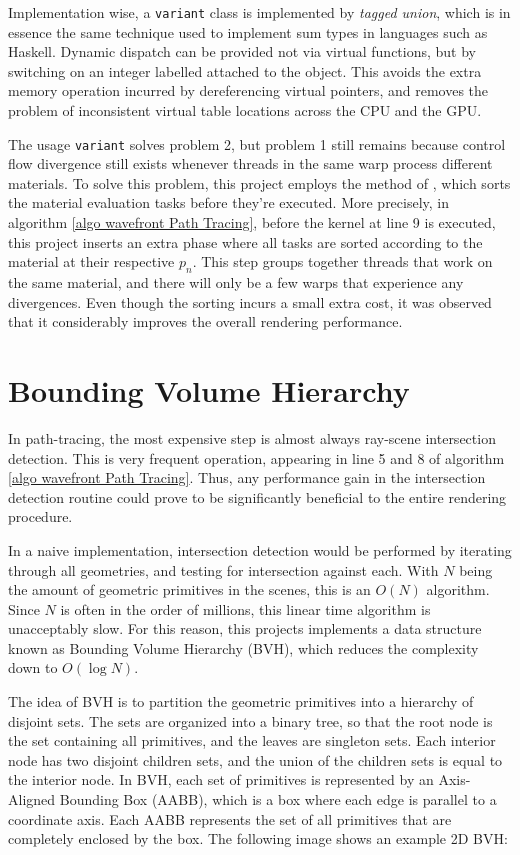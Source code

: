 Implementation wise, a \texttt{variant} class is implemented by \textit{tagged union}, which is in essence the same technique used to implement sum types in languages such as Haskell. Dynamic dispatch can be provided not via virtual functions, but by switching on an integer labelled attached to the object. This avoids the extra memory operation incurred by dereferencing virtual pointers, and removes the problem of inconsistent virtual table locations across the CPU and the GPU.

The usage \texttt{variant} solves problem 2, but problem 1 still remains because control flow divergence still exists whenever threads in the same warp process different materials. To solve this problem, this project employs the method of \cite{megakernel}, which sorts the material evaluation tasks before they're executed. More precisely, in algorithm \ref{algo wavefront Path Tracing}, before the kernel at line 9 is executed, this project inserts an extra phase where all tasks are sorted according to the material at their respective $p_n$. This step groups together threads that work on the same material, and there will only be a few warps that experience any divergences. Even though the sorting incurs a small extra cost, it was observed that it considerably improves the overall rendering performance.



\section{Bounding Volume Hierarchy}
In path-tracing, the most expensive step is almost always ray-scene intersection detection. This is very frequent operation, appearing in line 5 and 8 of algorithm \ref{algo wavefront Path Tracing}. Thus, any performance gain in the intersection detection routine could prove to be significantly beneficial to the entire rendering procedure. 

In a naive implementation, intersection detection would be performed by iterating through all geometries, and testing for intersection against each. With $N$ being the amount of geometric primitives in the scenes, this is an $O(N)$ algorithm. Since $N$ is often in the order of millions, this linear time algorithm is unacceptably slow. For this reason, this projects implements a data structure known as Bounding Volume Hierarchy (BVH), which reduces the complexity down to $O(\log N)$.

The idea of BVH is to partition the geometric primitives into a hierarchy of disjoint sets. The sets are organized into a binary tree, so that the root node is the set containing all primitives, and the leaves are singleton sets. Each interior node has two disjoint children sets, and the union of the children sets is equal to the interior node. In BVH, each set of primitives is represented by an Axis-Aligned Bounding Box (AABB), which is a box where each edge is parallel to a coordinate axis. Each AABB represents the set of all primitives that are completely enclosed by the box. The following image shows an example 2D BVH:

